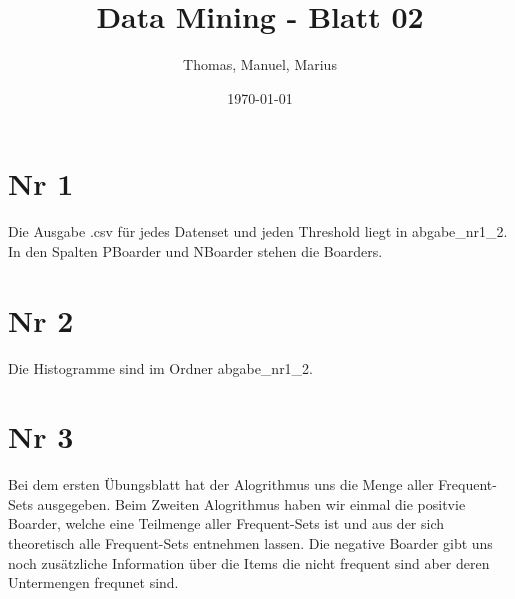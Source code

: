 \documentclass{article}
\title{Data Mining - Blatt 02}
\author{Thomas, Manuel, Marius}
\date{\today}
\begin{document}
\maketitle

\section{Nr 1}
Die Ausgabe .csv für jedes Datenset und jeden Threshold liegt in abgabe\_nr1\_2. In den Spalten PBoarder und NBoarder
stehen die Boarders.

\section{Nr 2}
Die Histogramme sind im Ordner abgabe\_nr1\_2.

\section{Nr 3}
Bei dem ersten Übungsblatt hat der Alogrithmus uns die Menge aller Frequent-Sets ausgegeben. Beim Zweiten Alogrithmus
haben wir einmal die positvie Boarder, welche eine Teilmenge aller Frequent-Sets ist und aus der sich theoretisch alle
Frequent-Sets entnehmen lassen. Die negative Boarder gibt uns noch zusätzliche Information über die Items die nicht
frequent sind aber deren Untermengen frequnet sind.
\end{document}

